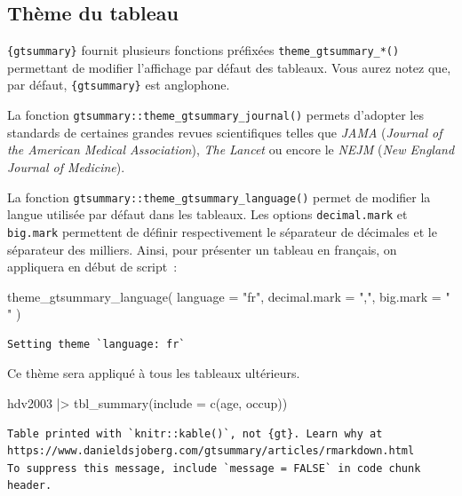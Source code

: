 \documentclass[
  letterpaper,
  DIV=11,
  numbers=noendperiod,
  oneside]{scrreprt}
\newenvironment{Shaded}{\begin{snugshade}}{\end{snugshade}}
\newcommand{\AttributeTok}[1]{\textcolor[rgb]{0.40,0.45,0.13}{#1}}
\newcommand{\FunctionTok}[1]{\textcolor[rgb]{0.28,0.35,0.67}{#1}}
\newcommand{\NormalTok}[1]{\textcolor[rgb]{0.00,0.23,0.31}{#1}}
\newcommand{\SpecialCharTok}[1]{\textcolor[rgb]{0.37,0.37,0.37}{#1}}
\newcommand{\StringTok}[1]{\textcolor[rgb]{0.13,0.47,0.30}{#1}}
\begin{document}
\hypertarget{sec-theme-gtsummary}{%
\subsection{Thème du tableau}\label{sec-theme-gtsummary}}

\texttt{\{gtsummary\}} fournit plusieurs fonctions préfixées
\texttt{theme\_gtsummary\_*()} permettant de modifier l'affichage par
défaut des tableaux. Vous aurez notez que, par défaut,
\texttt{\{gtsummary\}} est anglophone.

La fonction \texttt{gtsummary::theme\_gtsummary\_journal()} permets
d'adopter les standards de certaines grandes revues scientifiques telles
que \emph{JAMA} (\emph{Journal of the American Medical Association}),
\emph{The Lancet} ou encore le \emph{NEJM} (\emph{New England Journal of
Medicine}).

La fonction \texttt{gtsummary::theme\_gtsummary\_language()} permet de
modifier la langue utilisée par défaut dans les tableaux. Les options
\texttt{decimal.mark} et \texttt{big.mark} permettent de définir
respectivement le séparateur de décimales et le séparateur des milliers.
Ainsi, pour présenter un tableau en français, on appliquera en début de
script~:

\begin{Shaded}
\begin{Highlighting}[]
\FunctionTok{theme\_gtsummary\_language}\NormalTok{(}
  \AttributeTok{language =} \StringTok{"fr"}\NormalTok{, }
  \AttributeTok{decimal.mark =} \StringTok{","}\NormalTok{, }
  \AttributeTok{big.mark =} \StringTok{" "}
\NormalTok{)}
\end{Highlighting}
\end{Shaded}

\begin{verbatim}
Setting theme `language: fr`
\end{verbatim}

Ce thème sera appliqué à tous les tableaux ultérieurs.

\begin{Shaded}
\begin{Highlighting}[]
\NormalTok{hdv2003 }\SpecialCharTok{|\textgreater{}} 
  \FunctionTok{tbl\_summary}\NormalTok{(}\AttributeTok{include =} \FunctionTok{c}\NormalTok{(age, occup))}
\end{Highlighting}
\end{Shaded}

\begin{verbatim}
Table printed with `knitr::kable()`, not {gt}. Learn why at
https://www.danieldsjoberg.com/gtsummary/articles/rmarkdown.html
To suppress this message, include `message = FALSE` in code chunk header.
\end{verbatim}
\end{document}
